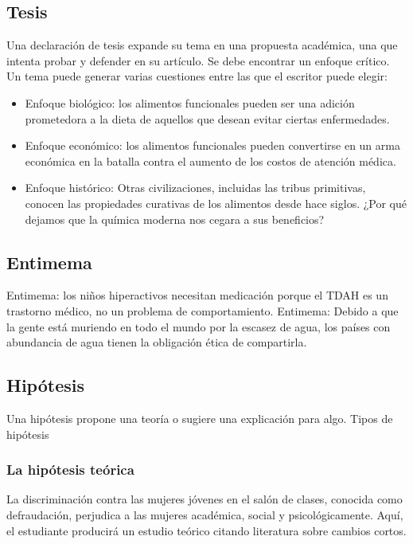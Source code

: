 \subsection{Tesis}
Una declaración de tesis expande su tema en una propuesta académica, una que intenta probar y defender en su artículo. Se debe encontrar un enfoque crítico.\\

Un tema puede generar varias cuestiones entre las que el escritor puede elegir: 
\begin{itemize}
    \item Enfoque biológico: los alimentos funcionales pueden ser una adición prometedora a la dieta de aquellos que desean evitar ciertas enfermedades. 
    \item Enfoque económico: los alimentos funcionales pueden convertirse en un arma económica en la batalla contra el aumento de los costos de atención médica. 
    \item Enfoque histórico: Otras civilizaciones, incluidas las tribus primitivas, conocen las propiedades curativas de los alimentos desde hace siglos. ¿Por qué dejamos que la química moderna nos cegara a sus beneficios?
\end{itemize}

\subsection{Entimema}
Entimema: los niños hiperactivos necesitan medicación porque el TDAH es un trastorno médico, no un problema de comportamiento. Entimema: Debido a que la gente está muriendo en todo el mundo por la escasez de agua, los países con abundancia de agua tienen la obligación ética de compartirla.

\subsection{Hipótesis}
Una hipótesis propone una teoría o sugiere una explicación para algo. Tipos de hipótesis

\subsubsection{La hipótesis teórica}
La discriminación contra las mujeres jóvenes en el salón de clases, conocida como defraudación, perjudica a las mujeres académica, social y psicológicamente. Aquí, el estudiante producirá un estudio teórico citando literatura sobre cambios cortos.

